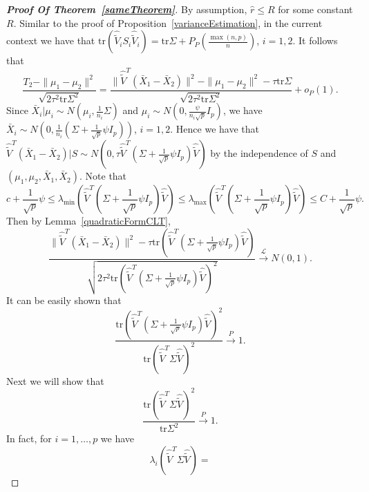 \documentclass[review]{elsarticle}
\theoremstyle{plain}
\theoremstyle{definition}
\theoremstyle{remark}
\begin{document}
\begin{proof}[\textbf{Proof Of Theorem~\ref{sameTheorem}}]
    By assumption, $\hat{r}\leq R$ for some constant $R$.
    Similar to the proof of Proposition~\ref{varianceEstimation}, in the current context we have that
    $\mathrm{tr}(\hat{\tilde{V}}_i S_i \hat{\tilde{V}}_i)=\mathrm{tr}\Sigma+P_P(\frac{\max(n,p)}{n})$, $i=1,2$. It follows that
    $$
    \frac{T_2-\|\mu_1-\mu_2\|^2}{\sqrt{2\tau^2 \mathrm{tr}\Sigma^2}}
    =
    \frac{\|\hat{\tilde{V}}^T(\bar{X}_1-\bar{X}_2)\|^2-\|\mu_1-\mu_2\|^2-\tau \mathrm{tr}\Sigma}{\sqrt{2\tau^2 \mathrm{tr}\Sigma^2}}+o_P(1).
    $$
 Since $\bar{X}_i|\mu_i\sim N(\mu_i,\frac{1}{n_i}\Sigma)$ and
    $\mu_i\sim N(0,\frac{\psi}{n_i\sqrt{p}}I_p)$,
we have $\bar{X}_i\sim N(0,\frac{1}{n_i}(\Sigma+\frac{1}{\sqrt{p}}\psi I_p))$, $i=1,2$.
    Hence we have that $\hat{\tilde{V}}^T(\bar{X}_1-\bar{X}_2)|S\sim N(0,\tau\hat{\tilde{V}}^T(\Sigma+\frac{1}{\sqrt{p}}\psi I_p)\hat{\tilde{V}})$ by the independence of $S$ and $(\mu_1,\mu_2,\bar{X}_1,\bar{X}_2)$.
    Note that 
    $$
    c+\frac{1}{\sqrt{p}}\psi
    \leq
    \lambda_{\min}(\hat{\tilde{V}}^T(\Sigma+\frac{1}{\sqrt{p}}\psi I_p)\hat{\tilde{V}})
    \leq
    \lambda_{\max}(\hat{\tilde{V}}^T(\Sigma+\frac{1}{\sqrt{p}}\psi I_p)\hat{\tilde{V}})
    \leq C+\frac{1}{\sqrt{p}}\psi.
    $$
    Then by Lemma~\ref{quadraticFormCLT},
    \begin{equation}\label{sameTheorem:5}
    \frac{\|\hat{\tilde{V}}^T(\bar{X}_1-\bar{X}_2)\|^2-\tau\mathrm{tr}(\hat{\tilde{V}}^T(\Sigma+\frac{1}{\sqrt{p}}\psi I_p)\hat{\tilde{V}})}{\sqrt{2\tau^2\mathrm{tr}(\hat{\tilde{V}}^T(\Sigma+\frac{1}{\sqrt{p}}\psi I_p)\hat{\tilde{V}})^2}}\xrightarrow{\mathcal{L}}N(0,1).
    \end{equation}
    It can be easily shown that
    \begin{equation}\label{sameTheorem:4}
    \frac{\mathrm{tr}(\hat{\tilde{V}}^T(\Sigma+\frac{1}{\sqrt{p}}\psi I_p)\hat{\tilde{V}})^2}{\mathrm{tr}(\hat{\tilde{V}}^T\Sigma\hat{\tilde{V}})^2}\xrightarrow{P}1.
\end{equation}
    Next we will show that
    \begin{equation}\label{sameTheorem:3}
    \frac{\mathrm{tr}(\hat{\tilde{V}}^T\Sigma\hat{\tilde{V}})^2}{\mathrm{tr}\Sigma^2
    }\xrightarrow{P}1.
    \end{equation}
    In fact, 
for $i=1,\ldots,p$ we have
    \begin{equation}\label{sameTheorem:1}
    \lambda_i (\hat{\tilde{V}}^T \Sigma \hat{\tilde{V}})
    =

\end{equation}
\end{proof}
\end{document}

